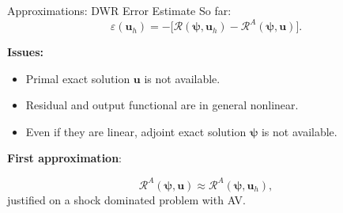 \documentclass{beamer}
\newcounter{sectionframecount}
\begin{document}
\begin{frame}[t]{Approximations: DWR Error Estimate}
  So far:
  \begin{equation}
    \varepsilon(\boldsymbol{u}_h) = -\Big[\mathcal{R}(\boldsymbol{\psi},\boldsymbol{u}_h) - \mathcal{R}^A(\boldsymbol{\psi},\boldsymbol{u})\Big].
  \end{equation}

  {
  \textbf{Issues:}

  \begin{itemize}
    \item Primal exact solution $\boldsymbol{u}$ is not available.
    \item Residual and output functional are in general nonlinear.
    \item Even if they are linear, adjoint exact solution $\boldsymbol{\psi}$ is not available.
  \end{itemize}
  }

  {
  \vspace{10pt}
  \textbf{First approximation}:

  \begin{equation}
    \mathcal{R}^A(\boldsymbol{\psi},\boldsymbol{u}) \approx
    \mathcal{R}^A(\boldsymbol{\psi},\boldsymbol{u}_h),
  \end{equation}
  justified on a shock dominated problem with AV.
  }
\end{frame}

\end{document}
